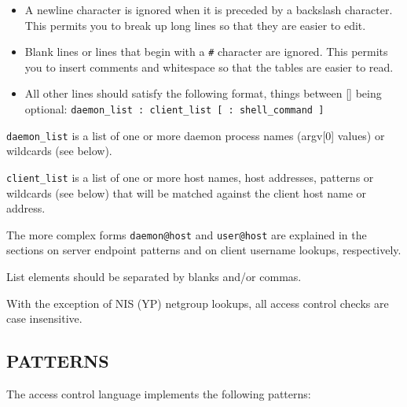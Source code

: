\documentclass[11pt,twoside,onecolumn]{book}
\begin{document}
\begin{itemize}

\item A newline character is ignored when it is preceded by a backslash
character. This permits you to break up long lines so that they are
easier to edit.

\item Blank lines or lines that begin with a {\tt \#} character are ignored.
This permits you to insert comments and whitespace so that the tables
are easier to read.

\item All other lines should satisfy the following format, things between []
being optional: {\tt daemon\_list : client\_list [ : shell\_command ] }

\end{itemize}

{\tt daemon\_list} is a list of one or more daemon process names
(argv[0] values) or wildcards (see below).  

{\tt client\_list} is a list
of one or more host names, host addresses, patterns or wildcards (see
below) that will be matched against the client host name or address.

The more complex forms {\tt daemon@host} and {\tt user@host} are
explained in the sections on server endpoint patterns and on client
username lookups, respectively.

List elements should be separated by blanks and/or commas.  

With the exception of NIS (YP) netgroup lookups, all access control
checks are case insensitive.

\subsection*{PATTERNS}

The access control language implements the following patterns:
\end{document}
